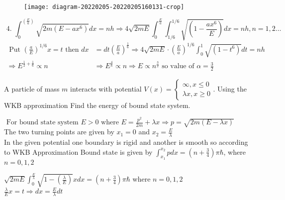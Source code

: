 \begin{enumerate}
\begin{answer}
\begin{minipage}{0.5\textwidth}
\begin{figure}[H]
	 	\texttt{[image: diagram-20220205-20220205160131-crop]}
	 \end{figure}
	 \end{minipage}
	 $$\text { 4. } \int_{0}^{\left(\frac{E}{a}\right)} \sqrt{2 m\left(E-a x^{6}\right)} d x=n h \Rightarrow 4 \sqrt{2 m E} \int_{0}^{\frac{E}{a}} \int_{1 / 6}^{1 / 6} \sqrt{\left(1-\frac{a x^{6}}{E}\right)} d x=n h, n=1,2 \ldots$$
	 \begin{align*}
	 	\text { Put }\left(\frac{a}{E}\right)^{1 / 6} x=t \text { then } d x&=d t\left(\frac{E}{a}\right)^{\frac{1}{6}} \Rightarrow 4 \sqrt{2 m E} \cdot\left(\frac{E}{a}\right)^{1 / 6} \int_{0}^{1} \sqrt{\left(1-t^{6}\right)} d t=n h \\
	 	\Rightarrow E^{\frac{1}{2}+\frac{1}{6}} \propto n &\Rightarrow E^{\frac{4}{6}} \propto n \Rightarrow E \propto n^{\frac{3}{2}} \text { so value of } \alpha=\frac{3}{2}
	 \end{align*}
\end{answer}
	\begin{minipage}{\textwidth}
	\item A particle of mass $m$ interacts with potential $V(x)=\left\{\begin{array}{l}\infty, x \leq 0 \\ \lambda x, x \geq 0\end{array} .\right.$ Using the WKB approximation Find the energy of bound state system.
\end{minipage}
\begin{answer}
$\text { For bound state system } E>0 \text { where } E=\frac{p^{2}}{2 m}+\lambda x \Rightarrow p=\sqrt{2 m(E-\lambda x)}$\\
The two turning points are given by $x_{1}=0$ and $x_{2}=\frac{E}{\lambda}$\\
In the given potential one boundary is rigid and another is smooth so according to WKB
Approximation Bound state is given by $\int_{x_{1}}^{x_{2}} p d x=\left(n+\frac{3}{4}\right) \pi \hbar$, where $n=0,1,2$\\
\begin{minipage}{0.5\textwidth}
$\sqrt{2 m E} \int_{0}^{\frac{E}{\lambda}} \sqrt{1-\left(\frac{\lambda}{E}\right)} x d x=\left(n+\frac{3}{4}\right) \pi \hbar$ where $n=0,1,2$ \\
$\frac{\lambda}{E} x=t \Rightarrow d x=\frac{E}{\lambda} d t$\\
\end{minipage}
\begin{minipage}{0.5\textwidth}

\end{minipage}
\end{answer}
\end{enumerate}
